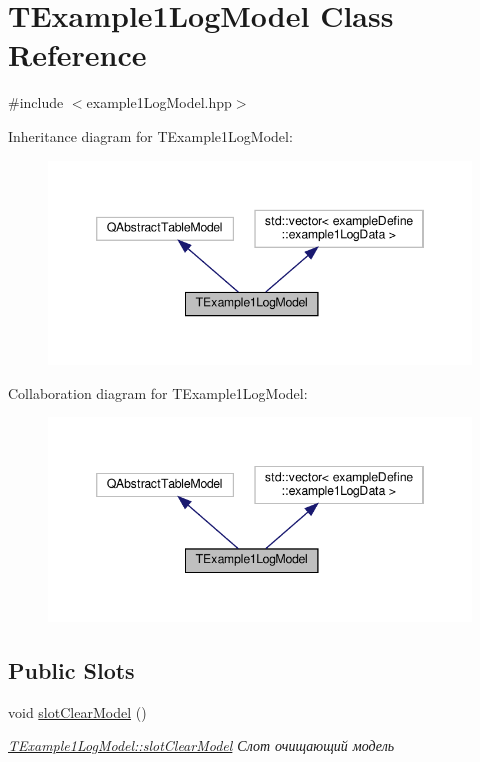 \hypertarget{class_t_example1_log_model}{}\section{T\+Example1\+Log\+Model Class Reference}
\label{class_t_example1_log_model}


{\ttfamily \#include $<$example1\+Log\+Model.\+hpp$>$}



Inheritance diagram for T\+Example1\+Log\+Model\+:\nopagebreak
\begin{figure}[H]
\begin{center}
\leavevmode
\includegraphics[width=346pt]{class_t_example1_log_model__inherit__graph}
\end{center}
\end{figure}


Collaboration diagram for T\+Example1\+Log\+Model\+:\nopagebreak
\begin{figure}[H]
\begin{center}
\leavevmode
\includegraphics[width=346pt]{class_t_example1_log_model__coll__graph}
\end{center}
\end{figure}
\subsection*{Public Slots}
\begin{DoxyCompactItemize}
\item 
void \hyperlink{class_t_example1_log_model_ad94610473fbd8834e350061f60e92f95}{slot\+Clear\+Model} ()
\begin{DoxyCompactList}\small\item\em \hyperlink{class_t_example1_log_model_ad94610473fbd8834e350061f60e92f95}{T\+Example1\+Log\+Model\+::slot\+Clear\+Model} Слот очищающий модель \end{DoxyCompactList}\end{DoxyCompactItemize}

